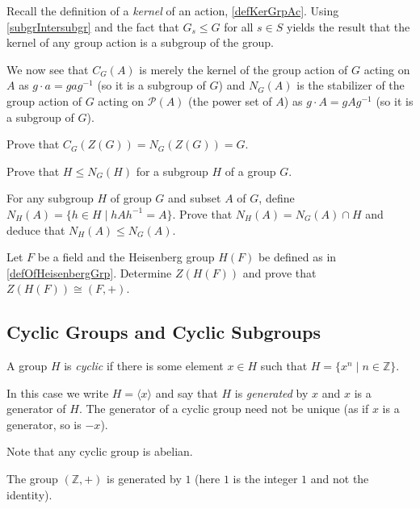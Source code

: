 Recall the definition of a \textit{kernel} of an action, \ref{defKerGrpAc}. Using \ref{subgrIntersubgr} and the fact that $G_s\leq G$ for all $s\in S$ yields the result that the kernel of any group action is a subgroup of the group.

\vspace{3mm}
We now see that $C_G(A)$ is merely the kernel of the group action of $G$ acting on $A$ as $g\cdot a= gag^{-1}$ (so it is a subgroup of $G$) and $N_G(A)$ is the stabilizer of the group action of $G$ acting on $\mathcal{P}(A)$ (the power set of $A$) as $g\cdot A=gAg^{-1}$ (so it is a subgroup of $G$).

\begin{exercise}
    Prove that $C_G(Z(G))=N_G(Z(G))=G$.
\end{exercise}

\begin{exercise}
    Prove that $H\leq N_G(H)$ for a subgroup $H$ of a group $G$.
\end{exercise}

\begin{exercise}
    For any subgroup $H$ of group $G$ and subset $A$ of $G$, define $N_H(A)=\{h\in H\mid hAh^{-1}=A\}$. Prove that $N_H(A)=N_G(A)\cap H$ and deduce that $N_H(A)\leq N_G(A)$.
\end{exercise}

\begin{exercise}
    Let $F$ be a field and the Heisenberg group $H(F)$ be defined as in \ref{defOfHeisenbergGrp}. Determine $Z(H(F))$ and prove that $Z(H(F))\cong (F,+)$.
\end{exercise}

\subsection{Cyclic Groups and Cyclic Subgroups}

\begin{definition}
    A group $H$ is \textit{cyclic} if there is some element $x\in H$ such that $H=\{x^n\mid n\in\mathbb{Z}\}$.
\end{definition}

In this case we write $H=\langle x\rangle$ and say that $H$ is \textit{generated} by $x$ and $x$ is a generator of $H$. The generator of a cyclic group need not be unique (as if $x$ is a generator, so is $-x$).

Note that any cyclic group is abelian.

\begin{example}
    The group $(\mathbb{Z},+)$ is generated by $1$ (here $1$ is the integer $1$ and not the identity).
\end{example}

